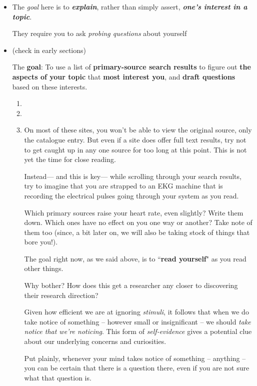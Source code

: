 \documentclass[11pt]{article}
\begin{document}
\begin{itemize}
\item The \emph{goal} here is to \emph{\textbf{explain}}, rather than simply assert, \emph{\textbf{one’s interest in a topic}}.

They require you to ask \emph{probing questions} about yourself

\item \begin{exercise} (check in early sections)

The \textbf{goal}: To use a list of \textbf{primary-source search results} to figure out \textbf{the aspects of your topic} that \textbf{most interest you}, and \textbf{draft questions} based on these interests.

\begin{enumerate}
\item 
\item 
\item On most of these sites, you won’t be able to view the original source, only the catalogue entry. But even if a site does offer full text results, try not to get caught up in any one source for too long at this point. This is not yet the time for close reading.

Instead— and this is key— while scrolling through your search results, try to imagine that you are strapped to an EKG machine that is recording the electrical pulses going through your system as you read. 

Which primary sources raise your heart rate, even slightly?  Write them down.
Which ones have no effect on you one way or another?  Take note of them too (since, a bit later on, we will also be taking stock of things that bore you!).

The goal right now, as we said above, is to ``\textbf{read yourself}" as you read other things.

Why bother? How does this get a researcher any closer to discovering their research direction? 

Given how efficient we are at ignoring \emph{stimuli}, it follows that when we do take notice of something -- however small or insignificant -- we should \emph{take notice that we’re noticing}. This form of \emph{self-evidence} gives a potential clue about our underlying concerns and curiosities.

Put plainly, whenever your mind takes notice of something -- anything -- you can be certain that there is a question there, even if you are not sure what that question is.


\end{enumerate}
\end{exercise}
\end{itemize}
\end{document}
